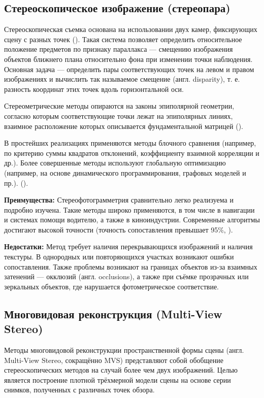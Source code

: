 \subsection{Стереоскопическое изображение (стереопара)}

Стереоскопическая съемка  основана на использовании двух камер, фиксирующих
сцену с разных точек (\cite{ussr1981phototech}).  Такая система позволяет
определить относительное положение предметов по признаку параллакса — смещению
изображения объектов ближнего плана относительно фона при изменении точки
наблюдения.  Основная задача — определить пары соответствующих точек на левом и
правом изображениях и вычислить так называемое смещение (англ.  disparity), т.
е.  разность координат этих точек вдоль горизонтальной оси.

Стереометрические методы опираются на законы эпиполярной геометрии,
согласно которым соответствующие точки лежат на эпиполярных линиях, взаимное
расположение которых описывается фундаментальной матрицей (\cite{Hartley:2003:MVG:861369}).

В простейших реализациях применяются методы блочного сравнения (например, по
критерию суммы квадратов отклонений, коэффициенту взаимной корреляции и др.).
Более совершенные методы используют глобальную оптимизацию (например, на основе
динамического программирования, графовых моделей и пр.). (\cite{kok2019reviewonsterevision}).

\textbf{Преимущества:} Стереофотограмметрия сравнительно легко реализуема и
подробно изучена. Такие методы широко применяются, в том числе в навигации и
системах помощи водителю, а также в киноиндустрии. Современные алгоритмы
достигают высокой точности (точность сопоставления превышает 95\%,
\cite{fsian2022comparisonstereomatchingalgorithms}).

\textbf{Недостатки:} Метод требует наличия перекрывающихся изображений и
наличия текстуры. В однородных или повторяющихся участках возникают ошибки
сопоставления. Также проблемы возникают на границах объектов из-за взаимных
затенений — окклюзий (англ. occlusions), а также при съёмке прозрачных или
зеркальных объектов, где нарушается фотометрическое соответствие.

\subsection{Многовидовая реконструкция (Multi-View Stereo)}

Методы многовидовой реконструкции пространственной формы сцены (англ.
Multi-View Stereo, сокращённо MVS) представляют собой обобщение
стереоскопических методов на случай более чем двух изображений. Целью
является построение плотной трёхмерной модели сцены на основе серии снимков,
полученных с различных точек обзора.

